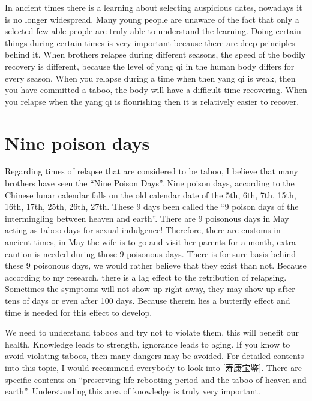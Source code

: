 \documentclass[
]{book}
\begin{document}
In ancient times there is a learning about selecting auspicious dates, nowadays it is no longer widespread. Many young people are unaware of the fact that only a selected few able people are truly able to understand the learning. Doing certain things during certain times is very important because there are deep principles behind it. When brothers relapse during different seasons, the speed of the bodily recovery is different, because the level of yang qi in the human body differs for every season. When you relapse during a time when then yang qi is weak, then you have committed a taboo, the body will have a difficult time recovering. When you relapse when the yang qi is flourishing then it is relatively easier to recover.

\hypertarget{nine-poison-days}{%
\section{Nine poison days}\label{nine-poison-days}}

Regarding times of relapse that are considered to be taboo, I believe that many brothers have seen the ``Nine Poison Days''. Nine poison days, according to the Chinese lunar calendar falls on the old calendar date of the 5th, 6th, 7th, 15th, 16th, 17th, 25th, 26th, 27th. These 9 days been called the ``9 poison days of the intermingling between heaven and earth''. There are 9 poisonous days in May acting as taboo days for sexual indulgence! Therefore, there are customs in ancient times, in May the wife is to go and visit her parents for a month, extra caution is needed during those 9 poisonous days. There is for sure basis behind these 9 poisonous days, we would rather believe that they exist than not. Because according to my research, there is a lag effect to the retribution of relapsing. Sometimes the symptoms will not show up right away, they may show up after tens of days or even after 100 days. Because therein lies a butterfly effect and time is needed for this effect to develop.

We need to understand taboos and try not to violate them, this will benefit our health. Knowledge leads to strength, ignorance leads to aging. If you know to avoid violating taboos, then many dangers may be avoided. For detailed contents into this topic, I would recommend everybody to look into {[}寿康宝鉴{]}. There are specific contents on ``preserving life rebooting period and the taboo of heaven and earth''. Understanding this area of knowledge is truly very important.
\end{document}
